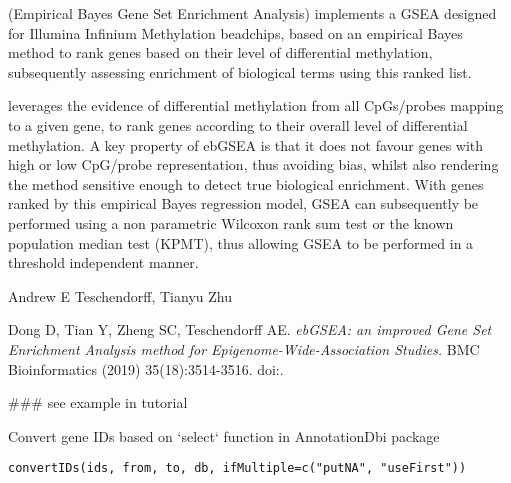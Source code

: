 \documentclass[letterpaper]{book}
\begin{document}
%
\begin{Description}\relax
{} (Empirical Bayes Gene Set Enrichment Analysis) implements a GSEA designed for
Illumina Infinium Methylation beadchips, based on an empirical Bayes method to rank genes
based on their level of differential methylation, subsequently assessing enrichment of biological
terms using this ranked list.
\end{Description}
%
\begin{Details}\relax
{} leverages the evidence of differential methylation from all CpGs/probes
mapping to a given gene, to rank genes according to their overall level of differential
methylation. A key property of ebGSEA is that it does not favour genes
with high or low CpG/probe representation, thus avoiding bias, whilst also
rendering the method sensitive enough to detect true biological enrichment. With genes
ranked by this empirical Bayes regression model, GSEA can subsequently be performed
using a non parametric Wilcoxon rank sum test or the known population median test
(KPMT), thus allowing GSEA to be performed in a threshold independent manner.
\end{Details}
%
\begin{Author}\relax
Andrew E Teschendorff, Tianyu Zhu
\end{Author}
%
\begin{References}\relax
Dong D, Tian Y, Zheng SC, Teschendorff AE.
\emph{ebGSEA: an improved Gene Set Enrichment Analysis method for Epigenome-Wide-Association Studies.}
BMC Bioinformatics (2019) 35(18):3514-3516.
doi:.
\end{References}
%
\begin{Examples}
\begin{ExampleCode}
### see example in tutorial

\end{ExampleCode}
\end{Examples}
%
\begin{Description}\relax
Convert gene IDs based on `select` function in AnnotationDbi package
\end{Description}
%
\begin{Usage}
\begin{verbatim}
convertIDs(ids, from, to, db, ifMultiple=c("putNA", "useFirst"))
\end{verbatim}
\end{Usage}
\end{document}
